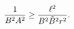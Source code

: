 \begin{equation}
{1\over B^{2} A^{2}}\ge {\ell^{2}\over B^{2}\tilde{B}^{2}r^{2}}.
\label{eq:geodcond}
\end{equation}

